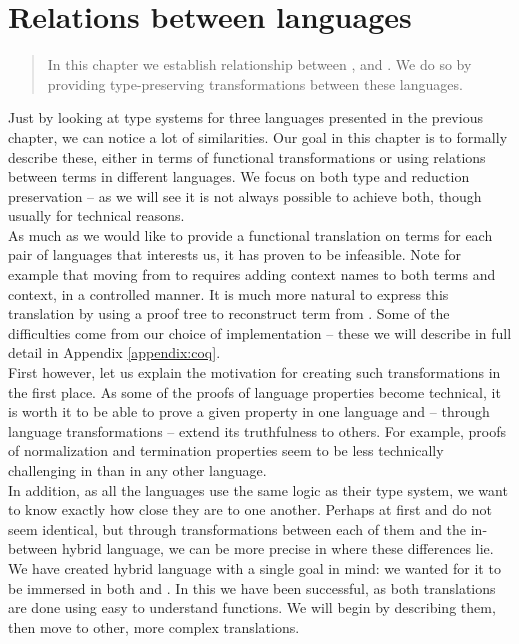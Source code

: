 \chapter{Relations between languages} \label{chapter:relations}

\begin{quote}
\small
In this chapter we establish relationship between \langL{}, \langLF{} and \langHyb{}. We do so by providing type-preserving transformations between these languages.
\end{quote}

Just by looking at type systems for three languages presented in the previous chapter, we can notice a lot of similarities. Our goal in this chapter is to formally describe these, either in terms of functional transformations or using relations between terms in different languages. We focus on both type and reduction preservation -- as we will see it is not always possible to achieve both, though usually for technical reasons.\\
As much as we would like to provide a functional translation on terms for each pair of languages that interests us, it has proven to be infeasible. Note for example that moving from \langLF{} to \langHyb{} requires adding context names to both terms and context, in a controlled manner. It is much more natural to express this translation by using a proof tree to reconstruct term from \langHyb{}. Some of the difficulties come from our choice of implementation -- these we will describe in full detail in Appendix \ref{appendix:coq}.\\

First however, let us explain the motivation for creating such transformations in the first place. As some of the proofs of language properties become technical, it is worth it to be able to prove a given property in one language and -- through language transformations -- extend its truthfulness to others. For example, proofs of normalization and termination properties seem to be less technically challenging in \langLF{} than in any other language. \\
In addition, as all the languages use the same logic as their type system, we want to know exactly how close they are to one another.  Perhaps at first \langL{} and \langLF{} do not seem identical, but through transformations between each of them and the in-between hybrid language, we can be more precise in where these differences lie.\\

We have created hybrid language \langHyb{} with a single goal in mind: we wanted for it to be immersed in both \langL{} and \langLF{}. In this we have been successful, as both translations are done using easy to understand functions. We will begin by describing them, then move to other, more complex translations.

